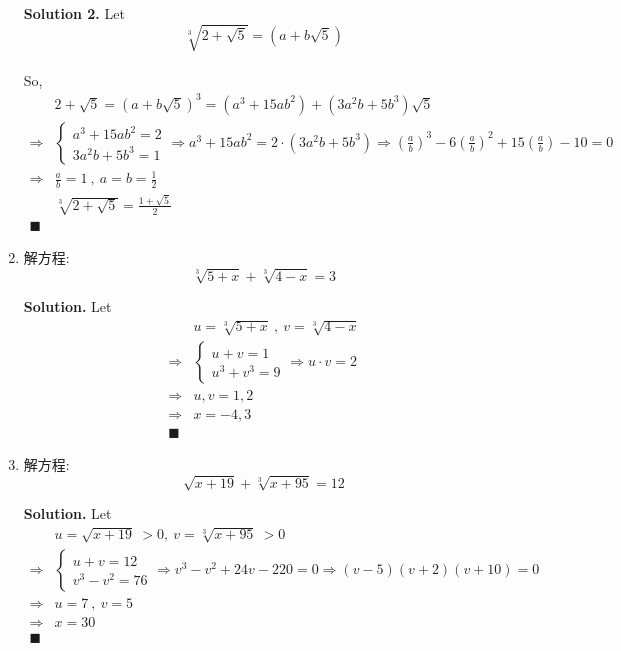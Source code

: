 \documentclass[UTF8]{article}
\begin{document}
\begin{enumerate}
    \noindent \textbf{Solution 2.}  Let $$ \sqrt[3]{2+\sqrt{5}} = (a + b \sqrt{5}) $$ \\
    So, 
    \begin{align*}
        & 2 + \sqrt{5} = (a+b\sqrt{5})^3 = (a^3 + 15ab^2) + (3a^2b + 5b^3)\sqrt{5} \\
        \Longrightarrow & \left\{
            \begin{aligned}
                a^3 + 15ab^2 = 2 \\
                3a^2b + 5b^3 = 1
            \end{aligned}
            \Longrightarrow a^3 + 15ab^2 = 2 \cdot (3a^2b + 5b^3)
            \Longrightarrow (\frac{a}{b})^3 -6(\frac{a}{b})^2 + 15(\frac{a}{b}) -10 = 0
            \right. \\
            \Longrightarrow & \frac{a}{b} = 1 \  , \  a = b = \frac{1}{2} \\
            & \sqrt[3]{2 + \sqrt{5}} = \frac{1+\sqrt{5}}{2} \\
            \blacksquare
        \end{align*}

        \item 解方程: $$ \sqrt[3]{5+x} +  \sqrt[3]{4-x} = 3 $$
        
        \noindent \textbf{Solution. }  Let
        \begin{align*}
           & u = \sqrt[3]{5+x} \ , \ v = \sqrt[3]{4-x} \\
            \Longrightarrow &
            \left \{
                \begin{aligned}
                u + v = 1 \\
                u^3 + v^3 = 9
                \end{aligned}
                \Longrightarrow u \cdot v = 2
            \right. \\
            \Longrightarrow & u,v = 1,2 \\
            \Longrightarrow & x = -4, 3 \\
            \blacksquare 
        \end{align*}

        \item 解方程: $$ \sqrt{x+19} +  \sqrt[3]{x+95} = 12 $$

        \noindent \textbf{Solution. }  Let
        \begin{align*}
           & u = \sqrt{x+19} \  > 0 , \ v = \sqrt[3]{x+95} \ > 0  \\
            \Longrightarrow &
            \left \{
                \begin{aligned}
                u + v = 12 \\
                v^3 - v^2 = 76
                \end{aligned}
                \Longrightarrow v^3 -v^2 + 24v -220 = 0
                \Longrightarrow (v-5)(v+2)(v+10) = 0
            \right. \\
            \Longrightarrow & u = 7 \ , \ v=5 \\
            \Longrightarrow & x = 30 \\
            \blacksquare 
        \end{align*}


\end{enumerate}
\end{document}
